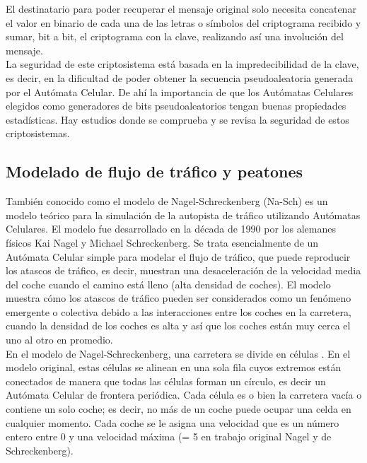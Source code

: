 El destinatario para poder recuperar el mensaje original solo necesita concatenar el valor en binario de cada una de las letras o símbolos del criptograma recibido y sumar, bit a bit, el criptograma con la clave, realizando así una involución del mensaje.\\

La seguridad de este criptosistema está basada en la impredecibilidad de la clave, es decir, en la dificultad de poder obtener la secuencia pseudoaleatoria generada por el Autómata Celular. De ahí la importancia de que los Autómatas Celulares elegidos como generadores de bits pseudoaleatorios tengan buenas propiedades estadísticas. Hay estudios donde se comprueba y se revisa la seguridad de estos criptosistemas.\\



\subsection{Modelado de flujo de tráfico y peatones}
También conocido como el modelo de Nagel-Schreckenberg (Na-Sch) es un modelo teórico para la simulación de la autopista de tráfico utilizando Autómatas Celulares. El modelo fue desarrollado en la década de 1990 por los alemanes físicos Kai Nagel y Michael Schreckenberg. Se trata esencialmente de un Autómata Celular simple para modelar el flujo de tráfico, que puede reproducir los atascos de tráfico, es decir, muestran una desaceleración de la velocidad media del coche cuando el camino está lleno (alta densidad de coches). El modelo muestra cómo los atascos de tráfico pueden ser considerados como un fenómeno emergente o colectiva debido a las interacciones entre los coches en la carretera, cuando la densidad de los coches es alta y así que los coches están muy cerca el uno al otro en promedio.\\

En el modelo de Nagel-Schreckenberg, una carretera se divide en células . En el modelo original, estas células se alinean en una sola fila cuyos extremos están conectados de manera que todas las células forman un círculo, es decir un Autómata Celular de frontera periódica. Cada célula es o bien la carretera vacía o contiene un solo coche; es decir, no más de un coche puede ocupar una celda en cualquier momento. Cada coche se le asigna una velocidad que es un número entero entre 0 y una velocidad máxima (= 5 en trabajo original Nagel y de Schreckenberg).\\

